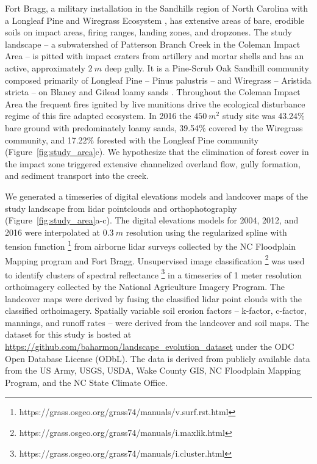 \documentclass[esurf, manuscript]{copernicus}
\begin{document}
Fort Bragg, a military installation 
in the Sandhills region of North Carolina %
with a Longleaf Pine and Wiregrass Ecosystem \citep{Sorrie2006},
has extensive areas of bare, erodible soils
on impact areas, firing ranges, landing zones, and dropzones. 
%
The study landscape
-- a subwatershed of Patterson Branch Creek 
in the Coleman Impact Area --
is pitted with impact craters from artillery and mortar shells
and has an active, approximately $2~m$ deep gully. 
%
It is a Pine-Scrub Oak Sandhill community
composed primarily of Longleaf Pine -- Pinus palustris --
and Wiregrass -- Aristida stricta --
on Blaney and Gilead loamy sands 
\citep{Sorrie2004}. 
%
Throughout the Coleman Impact Area
the frequent fires ignited by live munitions
drive the ecological disturbance regime
of this fire adapted ecosystem.
%
In 2016 the  $450~m^{2}$ study site was
43.24\% bare ground with predominately loamy sands,
39.54\% covered by the Wiregrass community, and
17.22\% forested with the Longleaf Pine community 
(Figure~\ref{fig:study_area}c). 
%
We hypothesize that the elimination of forest cover
in the impact zone
triggered extensive channelized overland flow,
gully formation, and sediment transport into the creek. 

We generated a timeseries of 
digital elevations models and landcover maps 
of the study landscape
from lidar pointclouds and orthophotography
(Figure~\ref{fig:study_area}a-c). 
The digital elevations models for 2004, 2012, and 2016
were interpolated at $0.3~m$ resolution
using the regularized spline with tension function \citep{Mitasova1993,Mitasova2005}
\footnote{https://grass.osgeo.org/grass74/manuals/v.surf.rst.html}
from %
airborne lidar surveys 
collected by the NC Floodplain Mapping program and Fort Bragg. 
%
Unsupervised image classification 
\footnote{https://grass.osgeo.org/grass74/manuals/i.maxlik.html}
was used to identify clusters of spectral reflectance
\footnote{https://grass.osgeo.org/grass74/manuals/i.cluster.html}
in a timeseries of 1 meter resolution orthoimagery 
collected by the National Agriculture Imagery Program.
The landcover maps were derived by fusing the
classified lidar point clouds with the classified orthoimagery.
Spatially variable soil erosion factors 
-- k-factor, c-factor, mannings, and runoff rates --
were derived from the landcover and soil maps.
The dataset for this study is hosted at 
\url{https://github.com/baharmon/landscape\_evolution_dataset}
under the ODC Open Database License (ODbL).
The data is derived from publicly available data from
the US Army, USGS, USDA, Wake County GIS, NC Floodplain
Mapping Program, and the NC State Climate Office.
\end{document}
